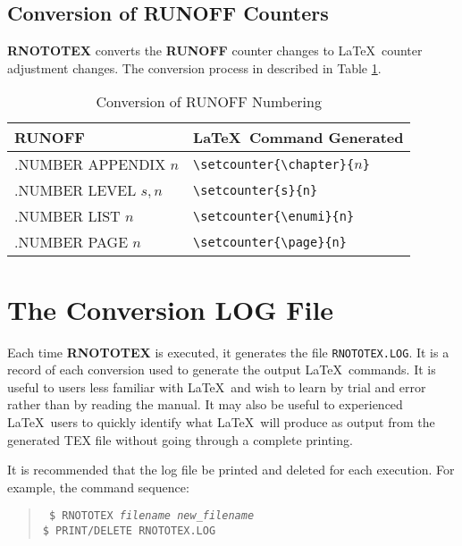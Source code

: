 \subsection{Conversion of RUNOFF Counters}

{\bf RNOTOTEX} converts the {\bf RUNOFF} counter changes to \LaTeX\ counter
adjustment changes.  The conversion process in described in Table
\ref{counter-commands}.

\begin{table}[h]
\begin{center}
\begin{tabular}{ll}
{\large\bf RUNOFF}	& {\LaTeX\ \large\bf Command Generated} \\ \hline
.NUMBER APPENDIX $n$   & \verb+\setcounter{\chapter}{+$n$\verb+}+ \\
.NUMBER LEVEL    $s,n$ & \verb+\setcounter{s}{n}+ \\
.NUMBER LIST     $n$   & \verb+\setcounter{\enumi}{n}+ \\
.NUMBER PAGE     $n$   & \verb+\setcounter{\page}{n}+ \\ \hline
\end{tabular}
\caption{Conversion of RUNOFF Numbering\label{counter-commands}}
\end{center}
\end{table}

\section{The Conversion LOG File}

Each time {\bf RNOTOTEX} is executed, it generates the file {\tt RNOTOTEX.LOG}.
It is a record of each conversion used to generate the output \LaTeX\ commands.
It is useful to users less familiar with \LaTeX\ and wish to learn by trial and
error rather than by reading the manual.  It may also be useful to experienced
\LaTeX\ users to quickly identify what \LaTeX\ will produce as output from the
generated TEX file without going through a complete printing.  

It is recommended that the log file be printed and deleted for each execution. 
For example, the command sequence:

\begin{quote}\tt
\$ RNOTOTEX {\it filename} {\it new\_filename}\\
\$ PRINT/DELETE RNOTOTEX.LOG
\end{quote}

